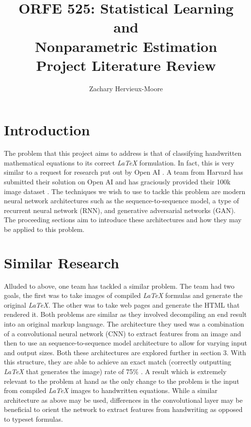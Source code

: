 \documentclass[12pt]{article}
\title{ORFE 525: Statistical Learning and \\ Nonparametric Estimation \\ Project Literature Review}
\author{Zachary Hervieux-Moore}
\date{\displaydate{date}}
\theoremstyle{colon}
\begin{document}
\maketitle

\clearpage

\section{Introduction}

The problem that this project aims to address is that of classifying handwritten mathematical equations to its correct \emph{LaTeX} formulation. In fact, this is very similar to a request for research put out by Open AI \cite{openai}. A team from Harvard has submitted their solution on Open AI and has graciously provided their 100k image dataset \cite{1609.04938}. The techniques we wish to use to tackle this problem are modern neural network architectures such as the sequence-to-sequence model, a type of recurrent neural network (RNN), and generative adversarial networks (GAN). The proceeding sections aim to introduce these architectures and how they may be applied to this problem.

\section{Similar Research}

Alluded to above, one team has tackled a similar problem. The team had two goals, the first was to take images of compiled \emph{LaTeX} formulas and generate the original \emph{LaTeX}. The other was to take web pages and generate the HTML that rendered it. Both problems are similar as they involved decompiling an end result into an original markup language. The architecture they used was a combination of a convolutional neural network (CNN) to extract features from an image and then to use an sequence-to-sequence model architecture to allow for varying input and output sizes. Both these architectures are explored further in section 3. With this structure, they are able to achieve an exact match (correctly outputting \emph{LaTeX} that generates the image) rate of 75\% \cite{1609.04938}. A result which is extremely relevant to the problem at hand as the only change to the problem is the input from compiled \emph{LaTeX} images to handwritten equations. While a similar architecture as above may be used, differences in the convolutional layer may be beneficial to orient the network to extract features from handwriting as opposed to typeset formulas.
\end{document}
